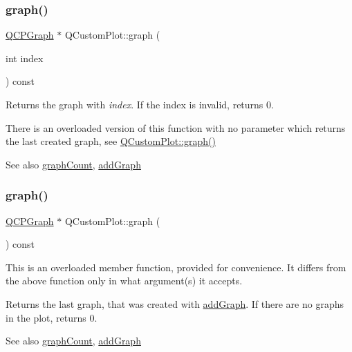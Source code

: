 \subsubsection{\texorpdfstring{graph()}{graph()}\hspace{0.1cm}{\footnotesize\ttfamily [1/2]}}
{\footnotesize\ttfamily \hyperlink{class_q_c_p_graph}{Q\+C\+P\+Graph} $\ast$ Q\+Custom\+Plot\+::graph (\begin{DoxyParamCaption}\item[{int}]{index }\end{DoxyParamCaption}) const}

Returns the graph with {\itshape index}. If the index is invalid, returns 0.

There is an overloaded version of this function with no parameter which returns the last created graph, see \hyperlink{class_q_custom_plot_a6ecae130f684b25276fb47bd3a5875c6}{Q\+Custom\+Plot\+::graph()}

\begin{DoxySeeAlso}{See also}
\hyperlink{class_q_custom_plot_a5e1787cdde868c4d3790f9ebc8207d90}{graph\+Count}, \hyperlink{class_q_custom_plot_a6fb2873d35a8a8089842d81a70a54167}{add\+Graph} 
\end{DoxySeeAlso}
\mbox{\label{class_q_custom_plot_aac190865a67f19af3fdf2136774997af}} 
\subsubsection{\texorpdfstring{graph()}{graph()}\hspace{0.1cm}{\footnotesize\ttfamily [2/2]}}
{\footnotesize\ttfamily \hyperlink{class_q_c_p_graph}{Q\+C\+P\+Graph} $\ast$ Q\+Custom\+Plot\+::graph (\begin{DoxyParamCaption}{ }\end{DoxyParamCaption}) const}

This is an overloaded member function, provided for convenience. It differs from the above function only in what argument(s) it accepts.

Returns the last graph, that was created with \hyperlink{class_q_custom_plot_a6fb2873d35a8a8089842d81a70a54167}{add\+Graph}. If there are no graphs in the plot, returns 0.

\begin{DoxySeeAlso}{See also}
\hyperlink{class_q_custom_plot_a5e1787cdde868c4d3790f9ebc8207d90}{graph\+Count}, \hyperlink{class_q_custom_plot_a6fb2873d35a8a8089842d81a70a54167}{add\+Graph} 
\end{DoxySeeAlso}
\mbox{\label{class_q_custom_plot_a5e1787cdde868c4d3790f9ebc8207d90}} 
